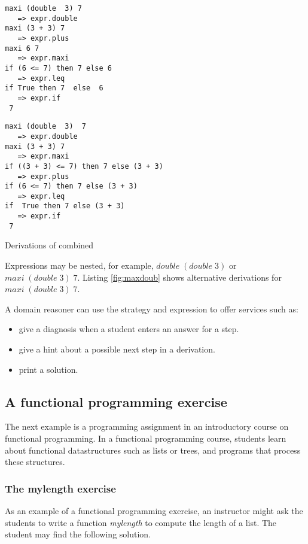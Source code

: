 \begin{Listing}
\begin{minipage}[t]{6cm}
\begin{verbatim}
maxi (double  3) 7 
   => expr.double
maxi (3 + 3) 7 
   => expr.plus
maxi 6 7 
   => expr.maxi
if (6 <= 7) then 7 else 6 
   => expr.leq
if True then 7  else  6 
   => expr.if
 7
\end{verbatim}
\end{minipage}
\begin{minipage}[t]{6cm}
\begin{verbatim}
maxi (double  3)  7 
   => expr.double
maxi (3 + 3) 7 
   => expr.maxi
if ((3 + 3) <= 7) then 7 else (3 + 3)
   => expr.plus
if (6 <= 7) then 7 else (3 + 3)
   => expr.leq
if  True then 7 else (3 + 3)
   => expr.if
 7 
\end{verbatim}
\end{minipage}
\caption{Derivations of combined}\label{fig:maxdoub}
\end{Listing}
Expressions may be nested, for example, $\mathit{double \;(double \; 3)}$ or $\mathit{maxi \;( double\;  3 )\;  7 }$.
Listing \ref{fig:maxdoub} shows alternative derivations for  $\mathit{maxi \;( double\;  3 )\;  7 }$.



A domain reasoner can use the strategy and expression to offer services such as:
\begin{itemize}
\item give a diagnosis when a student enters an answer for a step.  
\item give a hint about a possible next step in a derivation.
\item print a solution.
\end{itemize}




\subsection{A functional programming exercise}\label{sec:learning}

The next example is a programming assignment in an introductory course on functional programming.
In a functional programming course, students learn about functional datastructures such as lists or trees, and programs
that process these structures. 

\subsubsection{The mylength exercise}
\label{excs:mylength}
As an example of a functional programming exercise, an instructor might ask the students to write a function \textit{mylength} to compute the length of a list. 
The student may find the following solution.



